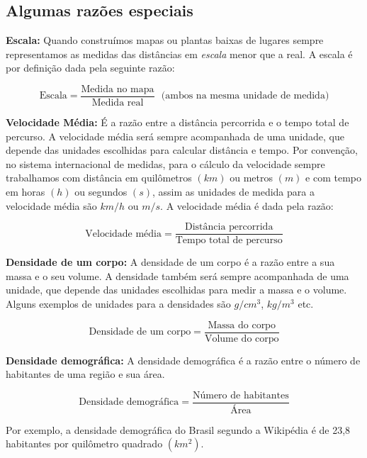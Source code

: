 \subsection{Algumas razões especiais}

\textbf{Escala:} Quando construímos mapas ou plantas baixas de lugares sempre representamos as medidas das distâncias em \textit{escala} menor que a real. A escala é por definição dada pela seguinte razão:

\begin{equation}
\text{Escala}= \frac{\text{Medida no mapa}}{\text{Medida real}} \ \ \ \text{(ambos na mesma unidade de medida)}
\end{equation}

\textbf{Velocidade Média:} É a razão entre a distância percorrida e o tempo total de percurso. A velocidade média será sempre acompanhada de uma unidade, que depende das unidades escolhidas para calcular distância e tempo. Por convenção, no sistema internacional de medidas, para o cálculo da velocidade sempre trabalhamos com distância em quilômetros $(km)$ ou metros $(m)$ e com tempo em horas $(h)$ ou segundos $(s)$, assim as unidades de medida para a velocidade média são $km/h$ ou $m/s$. A velocidade média é dada pela razão:

\begin{equation}
\text{Velocidade média}= \frac{\text{Distância percorrida}}{\text{Tempo total de percurso}}
\end{equation}

\textbf{Densidade de um corpo:} A densidade de um corpo é a razão entre a sua massa e o seu volume. A densidade também será sempre acompanhada de uma unidade, que depende das unidades escolhidas para medir a massa e o volume. Alguns exemplos de unidades para a densidades são $g/cm^3$, $kg/m^3$ etc.

\begin{equation}
\text{Densidade de um corpo}= \frac{\text{Massa do corpo}}{\text{Volume do corpo}}
\end{equation}

\textbf{Densidade demográfica:} A densidade demográfica é a razão entre o número de habitantes de uma região e sua área.

\begin{equation}
\text{Densidade demográfica}= \frac{\text{Número de habitantes}}{\text{Área}}
\end{equation}

Por exemplo, a densidade demográfica do Brasil segundo a Wikipédia é de 23,8 habitantes por quilômetro quadrado $(km^2)$.

